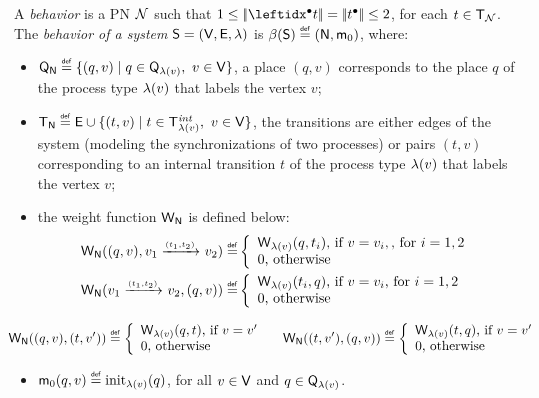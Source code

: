 \begin{definition}\label{def:behavior}
  A \emph{behavior} is a PN $\mathcal{N}$ such that $1 \leq
  \cardof{\pre{t}}=\cardof{\post{t}} \leq 2$, for each
  $t\in\mathsf{T}_{\mathcal{N}}$. The \emph{behavior of a system}
   $\mathsf{S}=(\mathsf{V},\mathsf{E},\lambda)$ is $\beta({\mathsf{S}}) \stackrel{\scriptscriptstyle{\mathsf{def}}}{=}
   (\mathsf{N},\mathsf{m}_0)$, where: \begin{itemize}
   \item $\mathsf{Q}_{\mathsf{N}} \stackrel{\scriptscriptstyle{\mathsf{def}}}{=} {\{ {(q,v) \mid q \in
     \mathsf{Q}_{\lambda(v)},~ v \in \mathsf{V}} \}}$, a place $(q,v)$ corresponds
     to the place $q$ of the process type $\lambda(v)$ that labels the
     vertex $v$;
   \item $\mathsf{T}_{\mathsf{N}} \stackrel{\scriptscriptstyle{\mathsf{def}}}{=} \mathsf{E} \cup {\{ {(t,v) \mid t \in
     \mathsf{T}^\mathit{int}_{\lambda(v)},~ v \in \mathsf{V}} \}}$, the transitions are
     either edges of the system (\ie modeling the synchronizations
     of two processes) or pairs $(t,v)$ corresponding to an internal
     transition $t$ of the process type $\lambda(v)$ that labels the
     vertex $v$;
   \item the weight function $\mathsf{W}_{\mathsf{N}}$ is defined below:
     \begin{align*}
       \mathsf{W}_{\mathsf{N}}((q,v),v_1 \xrightarrow{{\scriptscriptstyle (t_1,t_2)}}_{{\scriptscriptstyle }} v_2) \stackrel{\scriptscriptstyle{\mathsf{def}}}{=} & \left\{\begin{array}{ll}
       \mathsf{W}_{\lambda(v)}(q,t_i) \text{, if } v=v_i, \text{, for } i=1,2 \\
       0 \text{, otherwise}
       \end{array}\right.  \\
       \mathsf{W}_{\mathsf{N}}(v_1 \xrightarrow{{\scriptscriptstyle (t_1,t_2)}}_{{\scriptscriptstyle }} v_2,(q,v)) \stackrel{\scriptscriptstyle{\mathsf{def}}}{=} & \left\{\begin{array}{ll}
       \mathsf{W}_{\lambda(v)}(t_i,q) \text{, if } v=v_i \text{, for } i=1,2  \\
       0 \text{, otherwise}
       \end{array}\right.
     \end{align*}
     
     \vspace*{-.5\baselineskip}
     \begin{align*}
       \hspace*{-8mm}
       \weightof{\anet}((q,v),(t,v')) \isdef \left\{\begin{array}{ll}
       \weightof{\vlab(v)}(q,t) \text{, if } v=v' \\
       0 \text{, otherwise}
       \end{array}\right.
       \hspace*{4mm}
       \weightof{\anet}((t,v'),(q,v)) \isdef \left\{\begin{array}{ll}
       \weightof{\vlab(v)}(t,q) \text{, if } v=v' \\
       0 \text{, otherwise}
       \end{array}\right. 
     \end{align*}
   \item $\mathsf{m}_0(q,v)\stackrel{\scriptscriptstyle{\mathsf{def}}}{=}\mathrm{init}_{\lambda(v)}(q)$, for all $v \in \mathsf{V}$ and $q \in \mathsf{Q}_{\lambda(v)}$. 
   \end{itemize}
\end{definition}
